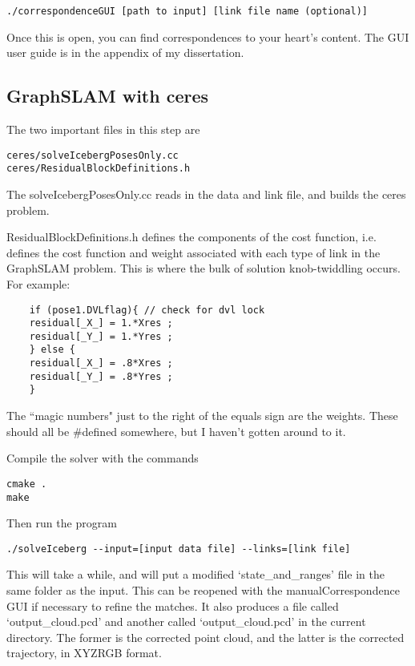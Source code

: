 \documentclass[12pt]{amsart}
\begin{document}
\begin{lstlisting}
./correspondenceGUI [path to input] [link file name (optional)]
\end{lstlisting}

Once this is open, you can find correspondences to your heart's content. The GUI user guide is in the appendix of my dissertation.

\subsection{GraphSLAM with ceres}

The two important files in this step are 
\begin{lstlisting}
ceres/solveIcebergPosesOnly.cc
ceres/ResidualBlockDefinitions.h
\end{lstlisting}

The solveIcebergPosesOnly.cc reads in the data and link file, and builds the ceres problem. 

ResidualBlockDefinitions.h defines the components of the cost function, i.e. defines the cost function and weight associated with each type of link in the GraphSLAM problem. This is where the bulk of solution knob-twiddling occurs. For example:
\begin{lstlisting}
	if (pose1.DVLflag){ // check for dvl lock
	residual[_X_] = 1.*Xres ;
	residual[_Y_] = 1.*Yres ;
	} else {
	residual[_X_] = .8*Xres ;
	residual[_Y_] = .8*Yres ;
	}
\end{lstlisting}

The ``magic numbers" just to the right of the equals sign are the weights. These should all be \#defined somewhere, but I haven't gotten around to it. 

Compile the solver with the commands 
\begin{lstlisting}
cmake .
make
\end{lstlisting}

Then run the program 
\begin{lstlisting}
./solveIceberg --input=[input data file] --links=[link file]
\end{lstlisting}

This will take a while, and will put a modified `state\_and\_ranges' file in the same folder as the input. This can be reopened with the manualCorrespondence GUI if necessary to refine the matches. It also produces a file called `output\_cloud.pcd' and another called `output\_cloud.pcd' in the current directory. The former is the corrected point cloud, and the latter is the corrected trajectory, in XYZRGB format.
\end{document}

